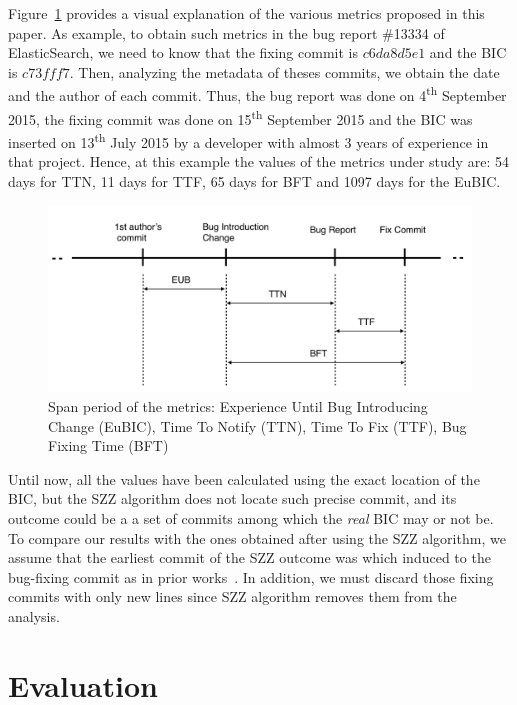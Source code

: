 \documentclass[10pt, conference]{IEEEtran}
\begin{document}
Figure~\ref{fig:metrics} provides a visual explanation of the various metrics proposed in this paper. As example, to obtain such metrics in the bug report \#13334 of ElasticSearch, we need to know that the fixing commit is $c6da8d5e1$ and the BIC is $c73fff7$. Then, analyzing the metadata of theses commits, we obtain the date and the author of each commit. Thus, the bug report was done on 4\textsuperscript{th} September 2015, the fixing commit was done on 15\textsuperscript{th} September 2015 and the BIC was inserted on 13\textsuperscript{th} July 2015 by a developer with almost 3 years of experience in that project. Hence, at this example the values of the metrics under study are: 54 days for TTN, 11 days for TTF, 65 days for BFT and 1097 days for the EuBIC.
\begin{figure}[ht]
\centering
\includegraphics[width=\columnwidth]{metrics.png}
\caption{ Span period of the metrics: Experience Until Bug Introducing Change (EuBIC),  Time To Notify (TTN), Time To Fix (TTF), Bug Fixing Time (BFT) }
\label{fig:metrics}       %
\end{figure}

Until now, all the values have been calculated using the exact location of the BIC, but the SZZ algorithm does not locate such precise commit, and its outcome could be a a set of commits among which the \emph{real} BIC may or not be. To compare our results with the ones obtained after using the SZZ algorithm, we assume that the earliest commit of the SZZ outcome was which induced to the bug-fixing commit as in prior works~\cite{eyolfson2011time}. In addition, we must discard those fixing commits with only new lines since SZZ algorithm removes them from the analysis.

\section{Evaluation}
\label{sec:evaluation}
\end{document}
